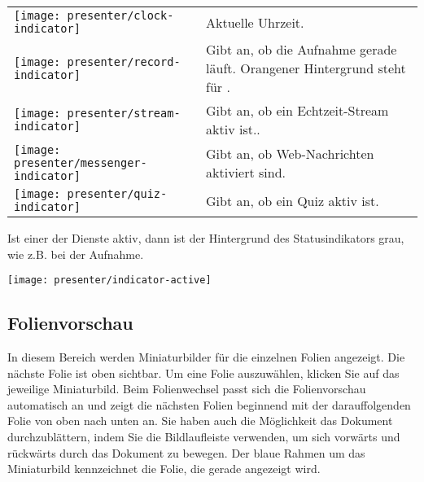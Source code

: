 \begin{longtable}{p{1cm}p{12cm}}
	\begin{minipage}{.05\textwidth}
		\texttt{[image: presenter/clock-indicator]}
	\end{minipage}
	& Aktuelle Uhrzeit. \\
	\begin{minipage}{.05\textwidth}
		\texttt{[image: presenter/record-indicator]}
	\end{minipage}
	& Gibt an, ob die Aufnahme gerade läuft. Orangener Hintergrund steht für \quote{pausiert}. \\
	\begin{minipage}{.05\textwidth}
		\texttt{[image: presenter/stream-indicator]}
	\end{minipage}
	& Gibt an, ob ein Echtzeit-Stream aktiv ist.. \\
	\begin{minipage}{.05\textwidth}
		\texttt{[image: presenter/messenger-indicator]}
	\end{minipage}
	& Gibt an, ob Web-Nachrichten aktiviert sind. \\
	\begin{minipage}{.05\textwidth}
		\texttt{[image: presenter/quiz-indicator]}
	\end{minipage}
	& Gibt an, ob ein Quiz aktiv ist. \\
\end{longtable}

Ist einer der Dienste aktiv, dann ist der Hintergrund des Statusindikators grau, wie z.B. bei der Aufnahme.

\begin{minipage}{\textwidth}
	\centering
	\texttt{[image: presenter/indicator-active]}
	\label{fig:presenter-indicator-active}
\end{minipage}


\subsection{Folienvorschau}
In diesem Bereich werden Miniaturbilder für die einzelnen Folien angezeigt. Die nächste Folie ist oben sichtbar. Um eine Folie auszuwählen, klicken Sie auf das jeweilige Miniaturbild. Beim Folienwechsel passt sich die Folienvorschau automatisch an und zeigt die nächsten Folien beginnend mit der darauffolgenden Folie von oben nach unten an. Sie haben auch die Möglichkeit das Dokument durchzublättern, indem Sie die Bildlaufleiste verwenden, um sich vorwärts und rückwärts durch das Dokument zu bewegen. Der blaue Rahmen um das Miniaturbild kennzeichnet die Folie, die gerade angezeigt wird.


